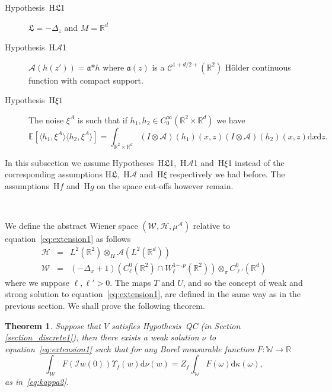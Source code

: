 \documentclass[a4paper,10pt]{article}
\newcommand{\asterisk}{\mathord{*}}
\newcommand{\mathd}{\mathrm{d}}
\newtheorem{theorem}{Theorem}
\newcommand{\descriptionparagraphs}[1]{\begin{description}#1\end{description}}
\begin{document}
{\descriptionparagraphs{\item[Hypothesis~H$\mathfrak{L}$1] $\mathfrak{L} = -
\Delta_z$ and $M =\mathbb{R}^d$

\item[Hypothesis~H$\mathcal{A}$1] $\mathcal{A} (h (z')) = \mathfrak{a}
\asterisk h$ where $\mathfrak{a} (z)$ is a $\mathcal{C}^{1 + d / 2 +}
(\mathbb{R}^2)$ H{\"o}lder continuous function with compact support.

\item[Hypothesis~H$\xi 1$] The noise $\xi^A$ is such that if $h_1, h_2 \in
C^{\infty}_0 (\mathbb{R}^2 \times \mathbb{R}^d)$ we have
\[ \mathbb{E} [\langle h_1, \xi^A \rangle \langle h_2^{}, \xi^A \rangle] =
   \int_{\mathbb{R}^2 \times \mathbb{R}^d} (I \otimes \mathcal{A}) (h_1) (x,
   z) (I \otimes \mathcal{A}) (h_2) (x, z) \mathd x \mathd z. \]
}}

In this subsection we assume Hypotheses~H$\mathfrak{L}$1,~H$\mathcal{A}$1
and~H$\xi$1 instead of the corresponding assumptions
H$\mathfrak{L}$,~H$\mathcal{A}$ and~H$\xi$ respectively we had before. The
assumptions~H$f$ and~H$g$ on the space cut-offs however remain.

\

We define the abstract Wiener space $(\mathcal{W}, \mathcal{H},
\mu^{\mathcal{A}})$ relative to equation~{\eqref{eq:extension1}} as follows
\begin{eqnarray}
  \mathcal{H} & = & L^2 (\mathbb{R}^2) \otimes_H \mathcal{A} (L^2
  (\mathbb{R}^d)) \nonumber\\
  \mathcal{W} & = & (- \Delta_x + 1) (C^0_{\ell} (\mathbb{R}^2) \cap W^{1 -,
  p}_{\ell} (\mathbb{R}^2)) \otimes_{\pi} C^0_{\ell'} (\mathbb{R}^d) \nonumber
\end{eqnarray}
where we suppose $\ell, \ell' > 0$. The maps $T$ and $U$, and so the concept
of weak and strong solution to equation~{\eqref{eq:extension1}}, are defined
in the same way as in the previous section. We shall prove the following
theorem.

\begin{theorem}
  \label{theorem_extension1}Suppose that $V$ satisfies Hypothesis~QC (in
  Section \ref{section_discrete1}), then there exists a weak solution $\nu$ to
  equation~{\eqref{eq:extension1}} such that for any Borel measurable function
  $F : \mathbb{W} \rightarrow \mathbb{R}$
  \[ \int_{\mathcal{W}} F (\mathcal{} \mathcal{I} w (0)) \Upsilon_f (w) \mathd
     \nu (w) = Z_f \int_{\mathbb{W}} F (\omega) \mathd \kappa (\omega), \]
  as in~{\eqref{eq:kappa2}}. 
\end{theorem}
\end{document}
